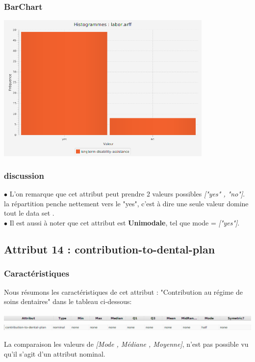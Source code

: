 \documentclass[12pt,a4paper,oneside]{book}
\begin{document}
\subsubsection{BarChart}

\begin{center}
	\includegraphics[width=0.8\textwidth]{screens/barchart/longterm-disability-assistance-barchart.png}%
	\label{labelname}%
\end{center}

\subsubsection{discussion}
$\bullet $ L'on remarque que cet attribut peut prendre 2 valeurs possibles \textit{["yes" , "no"]}. la répartition penche nettement vers le "yes", c'est à dire une seule valeur domine tout le data set .\\
$\bullet $ Il est aussi à noter que cet attribut est \textbf{Unimodale}, tel que mode = \textit{["yes"]}.

\newpage

\subsection{Attribut 14 : contribution-to-dental-plan }
\subsubsection{Caractéristiques}
Nous résumons les caractéristiques de cet attribut : "Contribution au régime de soins dentaires" dans le tableau ci-dessous:
\begin{center}
	\includegraphics[width=1\textwidth]{screens/att.png}\\ \includegraphics[width=1\textwidth]{screens/att-15.png}%
	\label{labelname}%
\end{center}
La comparaison les valeurs de \textit{[Mode , Médiane , Moyenne]}, n'est pas possible vu qu'il s'agit d'un attribut nominal.
\end{document}
